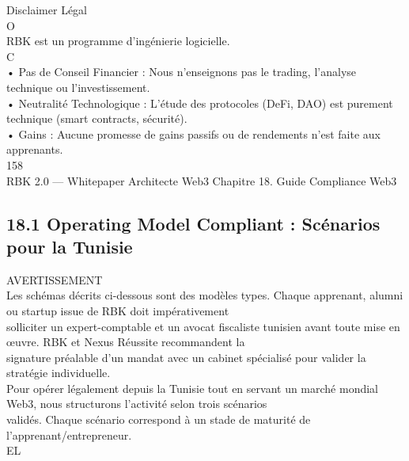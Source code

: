 Disclaimer Légal\\
O\\
\vspace{0.5em}
RBK est un programme d’ingénierie logicielle.\\
C\\
\vspace{0.5em}
\vspace{0.5em}
• Pas de Conseil Financier : Nous n’enseignons pas le trading, l’analyse technique ou l’investissement.\\
\vspace{0.5em}
• Neutralité Technologique : L’étude des protocoles (DeFi, DAO) est purement technique (smart contracts, sécurité).\\
\vspace{0.5em}
• Gains : Aucune promesse de gains passifs ou de rendements n’est faite aux apprenants.\\
\vspace{0.5em}
\vspace{0.5em}
\vspace{0.5em}
\vspace{0.5em}
158\\
RBK 2.0 — Whitepaper Architecte Web3                                                                 Chapitre 18. Guide Compliance Web3\\
\vspace{0.5em}
\vspace{0.5em}
\vspace{0.5em}
\subsection{18.1 Operating Model Compliant : Scénarios pour la Tunisie}
AVERTISSEMENT\\
Les schémas décrits ci-dessous sont des modèles types. Chaque apprenant, alumni ou startup issue de RBK doit impérativement\\
solliciter un expert-comptable et un avocat fiscaliste tunisien avant toute mise en œuvre. RBK et Nexus Réussite recommandent la\\
signature préalable d’un mandat avec un cabinet spécialisé pour valider la stratégie individuelle.\\
\vspace{0.5em}
Pour opérer légalement depuis la Tunisie tout en servant un marché mondial Web3, nous structurons l’activité selon trois scénarios\\
validés. Chaque scénario correspond à un stade de maturité de l’apprenant/entrepreneur.\\
\vspace{0.5em}
\vspace{0.5em}
\vspace{0.5em}
\vspace{0.5em}
EL\\
